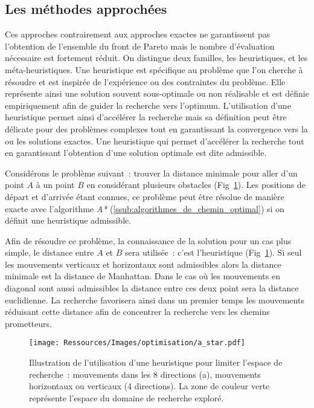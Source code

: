 \subsection{Les méthodes approchées} %
\label{sub:les_methodes_approchees}
Ces approches contrairement aux approches exactes ne garantissent pas
l’obtention de l’ensemble du front de Pareto mais le nombre d’évaluation
nécessaire est fortement réduit. On distingue deux familles, les heuristiques,
et les méta-heuristiques. Une heuristique est spécifique au problème que l’on
cherche à résoudre et est inspirée de l’expérience ou des contraintes du
problème. Elle représente ainsi une solution souvent sous-optimale ou non
réalisable et est définie empiriquement afin de guider la recherche vers
l’optimum. L’utilisation d’une heuristique permet ainsi d’accélérer la recherche
mais sa définition peut être délicate pour des problèmes complexes tout en
garantissant la convergence vers la ou les solutions exactes. Une heuristique
qui permet d’accélérer la recherche tout en garantissant l’obtention d’une
solution optimale est dite admissible.

Considérons le problème suivant~: trouver la distance minimale pour aller d’un point
$A$ à un point $B$ en considérant plusieurs obstacles (Fig~\ref{fig:a_star}).
Les positions de départ et d’arrivée étant connues, ce problème peut être résolue
de manière exacte avec l’algorithme \textit{A*} (\ref{ssub:algorithmes_de_chemin_optimal})
si on définit une heuristique admissible.

Afin de résoudre ce problème, la connaissance de la solution pour un cas plus
simple, le distance entre $A$ et $B$ sera utilisée~: c’est l’heuristique
(Fig~\ref{fig:a_star}). Si seul les mouvements verticaux et horizontaux sont
admissibles alors la distance minimale est la distance de Manhattan. Dans le cas
où les mouvements en diagonal sont aussi admissibles la distance entre ces deux
point sera la distance euclidienne. La recherche favorisera ainsi dans un
premier temps les mouvements réduisant cette distance afin de concentrer la
recherche vers les chemins prometteurs.

\begin{figure}
    \begin{center}
        \texttt{[image: Ressources/Images/optimisation/a\_star.pdf]}
    \end{center}
    \caption{Illustration de l’utilisation d’une heuristique pour limiter l’espace
             de recherche~: mouvements dans les 8 directions (a), mouvements
             horizontaux ou verticaux (4 directions). La zone de couleur verte
             représente l’espace du domaine de recherche exploré.
             \label{fig:a_star}}
\end{figure}

